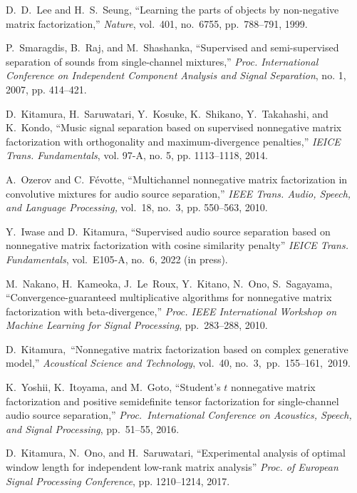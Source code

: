 \documentclass[honka]{nitkagawathesis}%
\begin{document}
\begin{thebibliography}{99}
  D.~D.~Lee and H.~S.~Seung,
  ``Learning the parts of objects by non-negative matrix factorization,''
  {\em Nature}, vol.~401, no.~6755, pp.~788--791, 1999.

  P.~Smaragdis, B.~Raj, and M.~Shashanka, 
  ``Supervised and semi-supervised separation of sounds from single-channel mixtures,''  
 {\em Proc. International Conference on Independent Component Analysis and Signal Separation}, no. 1, 2007, pp. 414–421.
  
  D.~Kitamura, H.~Saruwatari, Y.~Kosuke, K.~Shikano, Y.~Takahashi, and K.~Kondo, 
  ``Music signal separation based on supervised nonnegative matrix factorization with orthogonality and maximum-divergence penalties,'' 
  {\em IEICE Trans. Fundamentals}, vol. 97-A, no. 5, pp. 1113–1118, 2014.
  
  A.~Ozerov and C.~Févotte,
  ``Multichannel nonnegative matrix factorization in convolutive mixtures for audio source separation,'' 
  {\em IEEE Trans. Audio, Speech, and Language Processing,} vol.~18, no.~3, pp. 550--563, 2010.

  Y.~Iwase and D.~Kitamura, 
  ``Supervised audio source separation based on nonnegative matrix factorization with cosine similarity penalty''
  {\em IEICE Trans. Fundamentals}, vol.~E105-A, no.~6, 2022 (in press).

  M.~Nakano, H.~Kameoka, J.~Le~Roux, Y.~Kitano, N.~Ono, S.~Sagayama, ``Convergence-guaranteed multiplicative algorithms for nonnegative matrix factorization with beta-divergence,''
  {\em Proc. IEEE International Workshop on Machine Learning for Signal Processing}, pp.~283--288, 2010.

  D.~Kitamura,~``Nonnegative matrix factorization based on complex generative model,''
  {\em Acoustical Science and Technology}, vol.~40, no.~3,~pp.~155--161,~2019.

  K.~Yoshii, K.~Itoyama, and M.~Goto, ``Student's $t$ nonnegative matrix factorization and positive semidefinite tensor    
  factorization for single-channel audio source separation,''
  {\em Proc.~International Conference on Acoustics, Speech, and Signal Processing}, pp.~51--55, 2016.
  
  D.~Kitamura, N.~Ono, and H.~Saruwatari, 
  ``Experimental analysis of optimal window length for independent low-rank matrix analysis'' 
  {\em Proc. of European Signal Processing Conference}, pp. 1210–1214, 2017.

\end{thebibliography}
% 


\appendix


\end{document}
